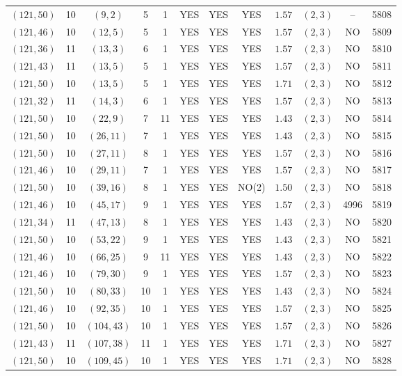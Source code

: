 \begin{longtable}{|c|c|c|c|c|c|c|c|c|c|c|c|}
$(121,50)$ & 10 & $(9,2)$ & 5 & 1 & YES & YES & YES & $1.57$ & $(2,3)$ & -- & 5808\\
$(121,46)$ & 10 & $(12,5)$ & 5 & 1 & YES & YES & YES & $1.57$ & $(2,3)$ & NO & 5809\\
$(121,36)$ & 11 & $(13,3)$ & 6 & 1 & YES & YES & YES & $1.57$ & $(2,3)$ & NO & 5810\\
$(121,43)$ & 11 & $(13,5)$ & 5 & 1 & YES & YES & YES & $1.57$ & $(2,3)$ & NO & 5811\\
$(121,50)$ & 10 & $(13,5)$ & 5 & 1 & YES & YES & YES & $1.71$ & $(2,3)$ & NO & 5812\\
$(121,32)$ & 11 & $(14,3)$ & 6 & 1 & YES & YES & YES & $1.57$ & $(2,3)$ & NO & 5813\\
$(121,50)$ & 10 & $(22,9)$ & 7 & 11 & YES & YES & YES & $1.43$ & $(2,3)$ & NO & 5814\\
$(121,50)$ & 10 & $(26,11)$ & 7 & 1 & YES & YES & YES & $1.43$ & $(2,3)$ & NO & 5815\\
$(121,50)$ & 10 & $(27,11)$ & 8 & 1 & YES & YES & YES & $1.57$ & $(2,3)$ & NO & 5816\\
$(121,46)$ & 10 & $(29,11)$ & 7 & 1 & YES & YES & YES & $1.57$ & $(2,3)$ & NO & 5817\\
$(121,50)$ & 10 & $(39,16)$ & 8 & 1 & YES & YES & NO(2) & $1.50$ & $(2,3)$ & NO & 5818\\
$(121,46)$ & 10 & $(45,17)$ & 9 & 1 & YES & YES & YES & $1.57$ & $(2,3)$ & 4996 & 5819\\
$(121,34)$ & 11 & $(47,13)$ & 8 & 1 & YES & YES & YES & $1.43$ & $(2,3)$ & NO & 5820\\
$(121,50)$ & 10 & $(53,22)$ & 9 & 1 & YES & YES & YES & $1.43$ & $(2,3)$ & NO & 5821\\
$(121,46)$ & 10 & $(66,25)$ & 9 & 11 & YES & YES & YES & $1.43$ & $(2,3)$ & NO & 5822\\
$(121,46)$ & 10 & $(79,30)$ & 9 & 1 & YES & YES & YES & $1.57$ & $(2,3)$ & NO & 5823\\
$(121,50)$ & 10 & $(80,33)$ & 10 & 1 & YES & YES & YES & $1.43$ & $(2,3)$ & NO & 5824\\
$(121,46)$ & 10 & $(92,35)$ & 10 & 1 & YES & YES & YES & $1.57$ & $(2,3)$ & NO & 5825\\
$(121,50)$ & 10 & $(104,43)$ & 10 & 1 & YES & YES & YES & $1.57$ & $(2,3)$ & NO & 5826\\
$(121,43)$ & 11 & $(107,38)$ & 11 & 1 & YES & YES & YES & $1.71$ & $(2,3)$ & NO & 5827\\
$(121,50)$ & 10 & $(109,45)$ & 10 & 1 & YES & YES & YES & $1.71$ & $(2,3)$ & NO & 5828\\

\end{longtable}
